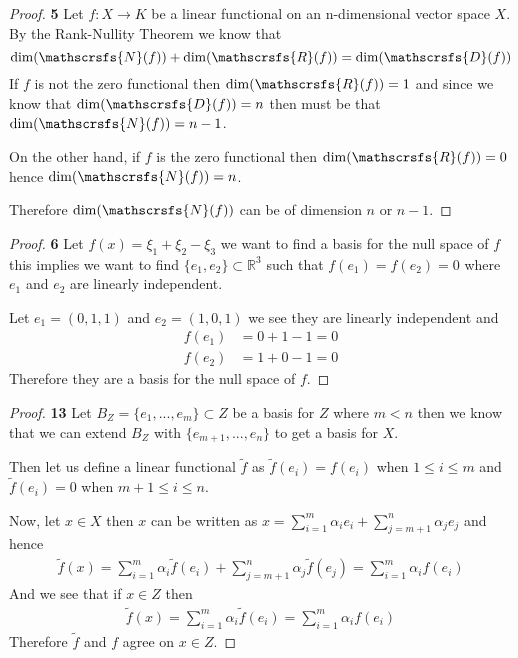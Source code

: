 \documentclass[11pt]{article}
\newcommand{\R}{\mathbb{R}}
\newcommand{\dom}{\mathscrsfs{D}}
\newcommand{\range}{\mathscrsfs{R}}
\newcommand{\nullsp}{\mathscrsfs{N}}
\theoremstyle{definition}
\begin{document}
\cleardoublepage
\begin{proof}{\textbf{5}}
    Let $f:X \to K$ be a linear functional on an n-dimensional vector space $X$.
    By the Rank-Nullity Theorem we know that
    $$\dim(\nullsp(f)) + \dim(\range(f)) = \dim(\dom(f))$$
    If $f$ is not the zero functional then $\dim(\range(f)) = 1$ and since we
    know that $\dim(\dom(f)) = n$ then must be that $\dim(\nullsp(f)) = n - 1$.

    On the other hand, if $f$ is the zero functional then $\dim(\range(f)) = 0$
    hence $\dim(\nullsp(f)) = n$.

    Therefore $\dim(\nullsp(f))$ can be of dimension $n$ or $n - 1$.     
\end{proof}
\begin{proof}{\textbf{6}}
    Let $f(x) = \xi_1 + \xi_2 - \xi_3$ we want to find a basis for the null
    space of $f$ this implies we want to find $\{e_1, e_2\} \subset \R^3$ such
    that $f(e_1) = f(e_2) = 0$ where $e_1$ and $e_2$ are linearly
    independent.
    
    Let $e_1 = (0, 1, 1)$ and $e_2 = (1, 0, 1)$ we see they are linearly
    independent and
    \begin{align*}
        f(e_1) &= 0 + 1 - 1 = 0\\
        f(e_2) &= 1 + 0 - 1 = 0
    \end{align*}
    Therefore they are a basis for the null space of $f$.
\end{proof}
\begin{proof}{\textbf{13}}
    Let $B_Z = \{e_1, ..., e_m\} \subset Z$ be a basis for $Z$ where $m < n$
    then we know that we can extend $B_Z$ with $\{e_{m+1},..., e_n\}$
    to get a basis for $X$.
    
    Then let us define a linear functional $\tilde{f}$ as
    $\tilde{f}(e_i) = f(e_i)$ when $1 \leq i \leq m$ and $\tilde{f}(e_i) = 0$
    when $m + 1\leq i \leq n$.

    Now, let $x \in X$ then $x$ can be written as
    $x = \sum_{i=1}^{m} \alpha_i e_i + \sum_{j=m + 1}^{n} \alpha_j e_j$
    and hence
    \begin{align*}
        \tilde{f}(x)
        = \sum_{i=1}^{m} \alpha_i \tilde{f}(e_i)
        + \sum_{j=m + 1}^{n} \alpha_j \tilde{f}(e_j)
        = \sum_{i=1}^{m} \alpha_i f(e_i)
    \end{align*}
    And we see that if $x \in Z$ then
    \begin{align*}
        \tilde{f}(x)
        = \sum_{i=1}^{m} \alpha_i \tilde{f}(e_i)
        = \sum_{i=1}^{m} \alpha_i f(e_i)
    \end{align*}
    Therefore $\tilde{f}$ and $f$ agree on $x \in Z$.
\end{proof}
\cleardoublepage
\end{document}
